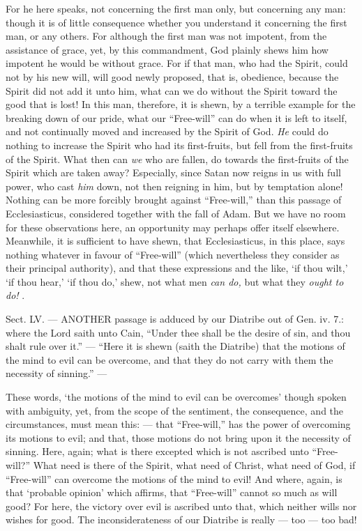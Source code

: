 For he here speaks, not concerning the first man only, but concerning any man: though it is of little consequence whether you understand it concerning the first man, or any others. For although the first man was not impotent, from the assistance of grace, yet, by this commandment, God plainly shews him how impotent he would be without grace. For if that man, who had the Spirit, could not by his new will, will good newly proposed, that is, obedience, because the Spirit did not add it unto him, what can we do without the Spirit toward the good that is lost! In this man, therefore, it is shewn, by a terrible example for the breaking down of our pride, what our “Free-will” can do when it is left to itself, and not continually moved and increased by the Spirit of God. \emph{He} could do nothing to increase the Spirit who had its first-fruits, but fell from the first-fruits of the Spirit. What then can \emph{we }who are fallen, do towards the first-fruits of the Spirit which are taken away? Especially, since Satan now reigns in us with full power, who cast \emph{him }down, not then reigning in him, but by temptation alone! Nothing can be more forcibly brought against “Free-will,” than this passage of Ecclesiasticus, considered together with the fall of Adam. But we have no room for these observations here, an opportunity may perhaps offer itself elsewhere. Meanwhile, it is sufficient to have shewn, that Ecclesiasticus, in this place, says nothing whatever in favour of “Free-will” (which nevertheless they consider as their principal authority), and that these expressions and the like, ‘if thou wilt,’ ‘if thou hear,’ ‘if thou do,’ shew, not what men \emph{can do, }but what they \emph{ought to do!} .


Sect. LV. — ANOTHER passage is adduced by our Diatribe out of Gen. iv. 7.: where the Lord saith unto Cain, “Under thee shall be the desire of sin, and thou shalt rule over it.” — “Here it is shewn (saith the Diatribe) that the motions of the mind to evil can be overcome, and that they do not carry with them the necessity of sinning.” —

These words, ‘the motions of the mind to evil can be overcomes’ though spoken with ambiguity, yet, from the scope of the sentiment, the consequence, and the circumstances, must mean this: — that “Free-will,” has the power of overcoming its motions to evil; and that, those motions do not bring upon it the necessity of sinning. Here, again; what is there excepted which is not ascribed unto “Free-will?” What need is there of the Spirit, what need of Christ, what need of God, if “Free-will” can overcome the motions of the mind to evil! And where, again, is that ‘probable opinion’ which affirms, that “Free-will” cannot so much as will good? For here, the victory over evil is ascribed unto that, which neither wills nor wishes for good. The inconsiderateness of our Diatribe is really — too — too bad!

